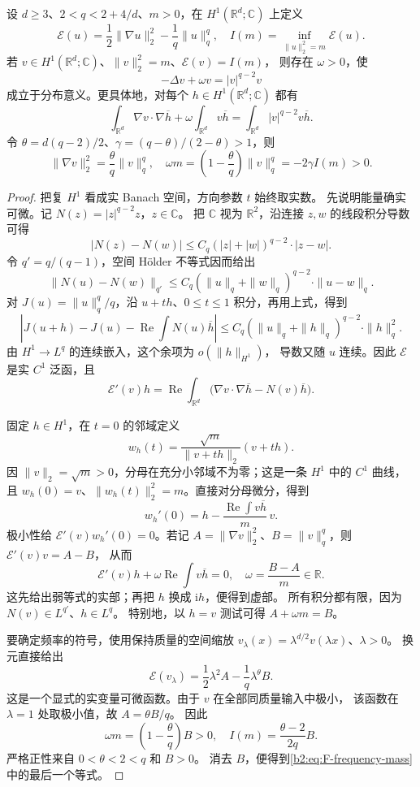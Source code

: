 \begin{proposition}[极小元的弱方程与频率]
\label{b2:prop:F-euler-frequency}
设 \(d\ge3\)、\(2<q<2+4/d\)、\(m>0\)，在
\(H^1(\mathbb R^d;\mathbb C)\) 上定义
\[
 \mathcal E(u)=\frac12\|\nabla u\|_2^2-\frac1q\|u\|_q^q,
 \quad I(m)=\inf_{\|u\|_2^2=m}\mathcal E(u).
\]
若 \(v\in H^1(\mathbb R^d;\mathbb C)\)、\(\|v\|_2^2=m\)、\(\mathcal E(v)=I(m)\)，
则存在 \(\omega>0\)，使
\[
 -\Delta v+\omega v=|v|^{q-2}v
\]
成立于分布意义。更具体地，对每个 \(h\in H^1(\mathbb R^d;\mathbb C)\) 都有
\[
 \int_{\mathbb R^d}\nabla v\cdot\nabla\overline h
 +\omega\int_{\mathbb R^d}v\overline h
 =\int_{\mathbb R^d}|v|^{q-2}v\overline h.
\]
令 \(\theta=d(q-2)/2\)、\(\gamma=(q-\theta)/(2-\theta)>1\)，则
\begin{equation}
 \|\nabla v\|_2^2=\frac\theta q\|v\|_q^q,
 \quad
 \omega m=\left(1-\frac\theta q\right)\|v\|_q^q
          =-2\gamma I(m)>0.
 \label{b2:eq:F-frequency-mass}
\end{equation}
\end{proposition}
\begin{proof}
把复 \(H^1\) 看成实 Banach 空间，方向参数 \(t\) 始终取实数。
先说明能量确实可微。记 \(N(z)=|z|^{q-2}z\)，\(z\in\mathbb C\)。
把 \(\mathbb C\) 视为 \(\mathbb R^2\)，沿连接 \(z,w\) 的线段积分导数可得
\[
 |N(z)-N(w)|\le C_q(|z|+|w|)^{q-2}\cdot|z-w|.
\]
令 \(q'=q/(q-1)\)，空间 Hölder 不等式因而给出
\[
 \|N(u)-N(w)\|_{q'}
 \le C_q(\|u\|_q+\|w\|_q)^{q-2}\cdot\|u-w\|_q.
\]
对 \(J(u)=\|u\|_q^q/q\)，沿 \(u+th\)、\(0\le t\le1\) 积分，再用上式，得到
\[
 \left|J(u+h)-J(u)-\operatorname{Re}\int N(u)\overline h\right|
 \le C_q(\|u\|_q+\|h\|_q)^{q-2}\cdot\|h\|_q^2.
\]
由 \(H^1\to L^q\) 的连续嵌入，这个余项为 \(o(\|h\|_{H^1})\)，
导数又随 \(u\) 连续。因此 \(\mathcal E\) 是实 \(C^1\) 泛函，且
\[
 \mathcal E'(v)h=
 \operatorname{Re}\int_{\mathbb R^d}
 \bigl(\nabla v\cdot\nabla\overline h-N(v)\overline h\bigr).
\]

固定 \(h\in H^1\)，在 \(t=0\) 的邻域定义
\[
 w_h(t)=\frac{\sqrt m}{\|v+th\|_2}(v+th).
\]
因 \(\|v\|_2=\sqrt m>0\)，分母在充分小邻域不为零；这是一条 \(H^1\) 中的 \(C^1\) 曲线，
且 \(w_h(0)=v\)、\(\|w_h(t)\|_2^2=m\)。直接对分母微分，得到
\[
 w_h'(0)=h-\frac{\operatorname{Re}\int v\overline h}{m}\,v.
\]
极小性给 \(\mathcal E'(v)w_h'(0)=0\)。若记
\(A=\|\nabla v\|_2^2\)、\(B=\|v\|_q^q\)，则 \(\mathcal E'(v)v=A-B\)，
从而
\[
 \mathcal E'(v)h+\omega\operatorname{Re}\int v\overline h=0,
 \quad\omega=\frac{B-A}{m}\in\mathbb R.
\]
这先给出弱等式的实部；再把 \(h\) 换成 \(\mathrm ih\)，便得到虚部。
所有积分都有限，因为 \(N(v)\in L^{q'}\)、\(h\in L^q\)。
特别地，以 \(h=v\) 测试可得 \(A+\omega m=B\)。

要确定频率的符号，使用保持质量的空间缩放
\(v_\lambda(x)=\lambda^{d/2}v(\lambda x)\)、\(\lambda>0\)。
换元直接给出
\[
 \mathcal E(v_\lambda)=\frac12\lambda^2A-\frac1q\lambda^\theta B.
\]
这是一个显式的实变量可微函数。由于 \(v\) 在全部同质量输入中极小，
该函数在 \(\lambda=1\) 处取极小值，故 \(A=\theta B/q\)。
因此
\[
 \omega m=\left(1-\frac\theta q\right)B>0,
 \quad
 I(m)=\frac{\theta-2}{2q}B.
\]
严格正性来自 \(0<\theta<2<q\) 和 \(B>0\)。
消去 \(B\)，便得到\eqref{b2:eq:F-frequency-mass}中的最后一个等式。
\end{proof}

